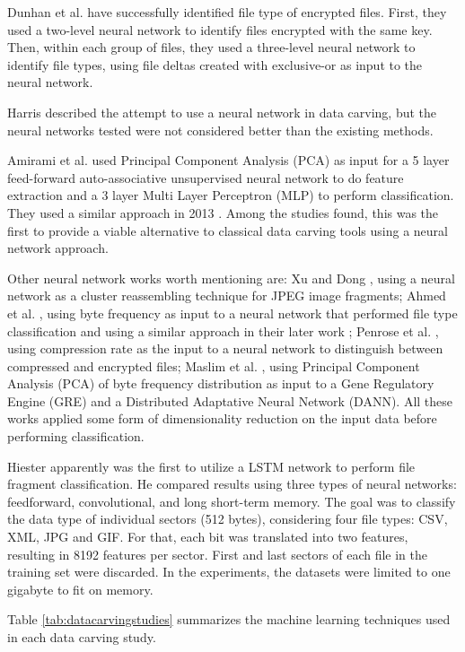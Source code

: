 Dunhan et al. \cite{dunham_classifying_2005} have successfully identified file type of encrypted files. First, they used a two-level neural network to identify files encrypted with the same key. Then, within each group of files, they used a three-level neural network to identify file types, using file deltas created with exclusive-or as input to the neural network. 

Harris \cite{harris_using_2007} described the attempt to use a neural network in data carving, but the neural networks tested were not considered better than the existing methods.

Amirami et al.  \cite{amirani_new_2008} used Principal Component Analysis (PCA) as input for a 5 layer feed-forward auto-associative unsupervised neural network to do feature extraction and a 3 layer Multi Layer Perceptron (MLP) to perform classification. They used a similar approach in 2013 \cite{amirani_feature-based_2013}. 
Among the studies found, this was the first to provide a viable alternative to classical data carving tools using a neural network approach. 

Other neural network works worth mentioning are:
Xu and Dong \cite{xu_reassembling_2009}, using a neural network as a cluster reassembling technique for JPEG image fragments;
Ahmed et al. \cite{ahmed_content-based_2010}, using byte frequency as input to a neural network that performed file type classification and using a similar approach in their later work \cite{ahmed_fast_2011};
Penrose et al. \cite{penrose_approaches_2013}, using compression rate as the input to a neural network to distinguish between compressed and encrypted files;
Maslim et al. \cite{maslim_distributed_2014}, using Principal Component Analysis (PCA) of byte frequency distribution as input to a Gene Regulatory Engine (GRE) and a Distributed Adaptative Neural Network (DANN).
All these works applied some form of dimensionality reduction on the input data before performing classification.

Hiester \cite{hiester_file_2018} apparently was the first to utilize a LSTM network to perform file fragment classification. He compared results using three types of neural networks: feedforward, convolutional, and long short-term memory. The goal was to classify the data type of individual sectors (512 bytes), considering four file types: CSV, XML, JPG and GIF. For that, each bit was translated into two features, resulting in 8192 features per sector. First and last sectors of each file in the training set were discarded. In the experiments, the datasets were limited to one gigabyte to fit on memory.

Table \ref{tab:datacarvingstudies} summarizes the  machine learning techniques used in each data carving study.

